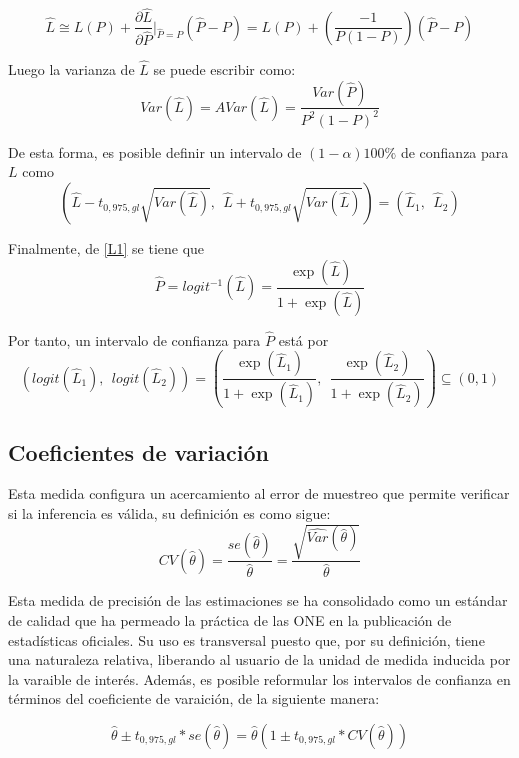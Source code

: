 \documentclass[
  12pt,
  spanish,
]{book}
\begin{document}
\[
\hat{L} \cong L(P) + \frac{\partial \hat{L}}{\partial \hat{P}}\biggr\rvert_{\hat{P}=P}(\hat{P}-P) = L(P) + \left( \dfrac{-1}{P(1-P)}\right)(\hat{P}-P)
\]

Luego la varianza de \(\hat{L}\) se puede escribir como:
\[
Var(\hat{L}) = AVar(\hat{L}) = \dfrac{Var(\hat{P})}{P^2(1-P)^2}
\]

De esta forma, es posible definir un intervalo de \((1-\alpha)100\%\) de confianza para \(L\) como
\[
\left(\hat{L} - t_{0,975, gl}\sqrt{Var(\hat{L})}, \ \
\hat{L} + t_{0,975, gl}\sqrt{Var(\hat{L})}
\right) =
(\hat{L}_1, \ \ \hat{L}_2)
\]

Finalmente, de \eqref{L1} se tiene que
\[
\hat{P} = logit^{-1}(\hat L) = \dfrac{\exp (\hat{L})}{1+\exp (\hat{L})}
\]

Por tanto, un intervalo de confianza para \(\hat{P}\) está por
\[
\left(logit(\hat{L}_1), \ \ logit(\hat{L}_2)\right) = 
\left(
\dfrac{\exp (\hat{L}_1)}{1+\exp (\hat{L}_1)}, \ \
\dfrac{\exp (\hat{L}_2)}{1+\exp (\hat{L}_2)}
\right) \subseteq (0, 1)
\]

\hypertarget{coeficientes-de-variaciuxf3n}{%
\subsection{Coeficientes de variación}\label{coeficientes-de-variaciuxf3n}}

Esta medida configura un acercamiento al error de muestreo que permite verificar si la inferencia es válida, su definición es como sigue:
\[
CV(\hat\theta) = \frac{se(\hat\theta)}{\hat\theta} = \frac{\sqrt{\widehat{Var}(\hat\theta)}}{\hat\theta}
\]

Esta medida de precisión de las estimaciones se ha consolidado como un estándar de calidad que ha permeado la práctica de las ONE en la publicación de estadísticas oficiales. Su uso es transversal puesto que, por su definición, tiene una naturaleza relativa, liberando al usuario de la unidad de medida inducida por la varaible de interés. Además, es posible reformular los intervalos de confianza en términos del coeficiente de varaición, de la siguiente manera:

\[
\hat\theta \pm t_{0,975, gl} * se(\hat\theta) = \hat\theta  \left(1 \pm t_{0,975, gl} * CV(\hat\theta)\right)
\]
\end{document}
